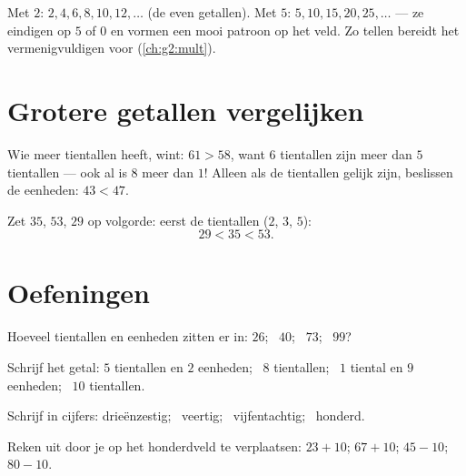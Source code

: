 \begin{example}\label{ex:g1:tens:skip}
Met $2$: $2, 4, 6, 8, 10, 12, \dots$ (de even getallen). Met $5$:
$5, 10, 15, 20, 25, \dots$ --- ze eindigen op $5$ of $0$ en vormen een
mooi patroon op het veld. Zo tellen bereidt het vermenigvuldigen voor
(\cref{ch:g2:mult}).
\end{example}

\section{Grotere getallen vergelijken}

\begin{method}\label{met:g1:tens:compare}
Wie meer tientallen heeft, wint: $61 > 58$, want $6$ tientallen zijn
meer dan $5$ tientallen --- ook al is $8$ meer dan $1$! Alleen als de
tientallen gelijk zijn, beslissen de eenheden: $43 < 47$.
\end{method}

\begin{example}\label{ex:g1:tens:compare}
Zet $35$, $53$, $29$ op volgorde: eerst de tientallen ($2$, $3$, $5$):
\[
29 < 35 < 53 .
\]
\end{example}

\section{Oefeningen}

\begin{exercise}[$\star$]\label{exo:g1:tens:1}
Hoeveel tientallen en eenheden zitten er in: $26$; \ $40$; \ $73$;
\ $99$?
\end{exercise}

\begin{exercise}[$\star$]\label{exo:g1:tens:2}
Schrijf het getal: $5$ tientallen en $2$ eenheden; \ $8$ tientallen;
\ $1$ tiental en $9$ eenheden; \ $10$ tientallen.
\end{exercise}

\begin{exercise}[$\star$]\label{exo:g1:tens:3}
Schrijf in cijfers: drieënzestig; \ veertig; \ vijfentachtig; \
honderd.
\end{exercise}

\begin{exercise}[$\star$]\label{exo:g1:tens:4}
Reken uit door je op het honderdveld te verplaatsen: $23 + 10$; \quad
$67 + 10$; \quad $45 - 10$; \quad $80 - 10$.
\end{exercise}

